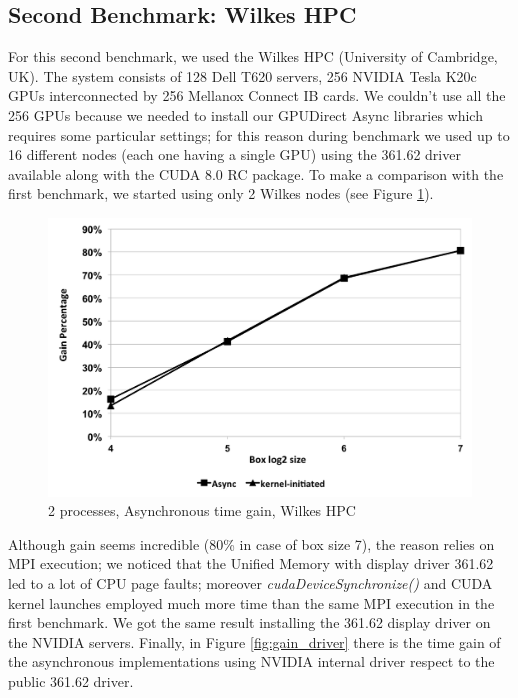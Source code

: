 \documentclass[conference]{IEEEtran}
\begin{document}

\subsection{Second Benchmark: Wilkes HPC}

For this second benchmark, we used the Wilkes HPC (University of Cambridge, UK)\cite{wilkes}. The system consists of 128 Dell T620 servers, 256 NVIDIA Tesla K20c GPUs interconnected by 256 Mellanox Connect IB cards.
We couldn't use all the 256 GPUs because we needed to install our GPUDirect Async libraries which requires some particular settings; for this reason during benchmark we used up to 16 different nodes (each one having a single GPU) using the 361.62 driver available along with the CUDA 8.0 RC package.
To make a comparison with the first benchmark, we started using only 2 Wilkes nodes (see Figure \ref{fig:gain_wilkes}).

\begin{figure}[h]
\includegraphics[scale=0.4]{gain_wilkes.png}
\caption{2 processes, Asynchronous time gain, Wilkes HPC}
\label{fig:gain_wilkes}
\end{figure}

Although gain seems incredible (80\% in case of box size 7), the reason relies on MPI execution; we noticed that the Unified Memory with display driver 361.62 led to a lot of CPU page faults; moreover \textit{cudaDeviceSynchronize()} and CUDA kernel launches employed much more time than the same MPI execution in the first benchmark. We got the same result installing the 361.62 display driver on the NVIDIA servers.
Finally, in Figure \ref{fig:gain_driver} there is the time gain of the asynchronous implementations using NVIDIA internal driver respect to the public 361.62 driver.\\
\end{document}
